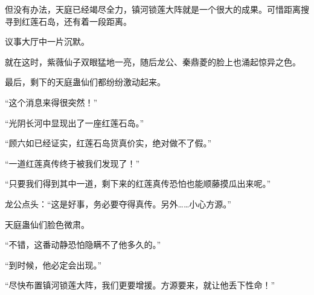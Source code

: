 \begin{this_body}
但没有办法，天庭已经竭尽全力，镇河锁莲大阵就是一个很大的成果。可惜距离搜寻到红莲石岛，还有着一段距离。

议事大厅中一片沉默。

就在这时，紫薇仙子双眼猛地一亮，随后龙公、秦鼎菱的脸上也涌起惊异之色。

最后，剩下的天庭蛊仙们都纷纷激动起来。

“这个消息来得很突然！”

“光阴长河中显现出了一座红莲石岛。”

“顾六如已经证实，红莲石岛货真价实，绝对做不了假。”

“一道红莲真传终于被我们发现了！”

“只要我们得到其中一道，剩下来的红莲真传恐怕也能顺藤摸瓜出来呢。”

龙公点头：“这是好事，务必要夺得真传。另外……小心方源。”

天庭蛊仙们脸色微肃。

“不错，这番动静恐怕隐瞒不了他多久的。”

“到时候，他必定会出现。”

“尽快布置镇河锁莲大阵，我们更要增援。方源要来，就让他丢下性命！”

\end{this_body}

